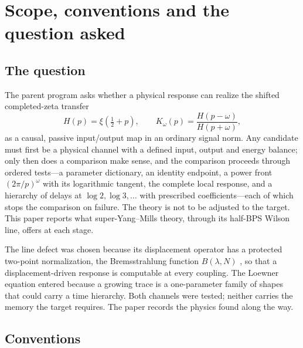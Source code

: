 \section{Scope, conventions and the question asked}
\label{sec:scope}

\subsection{The question}

The parent program asks whether a physical response can realize the shifted completed-zeta transfer
\begin{equation}
H(p)=\xi(\tfrac12+p),\qquad K_\omega(p)=\frac{H(p-\omega)}{H(p+\omega)},
\label{eq:target}
\end{equation}
as a causal, passive input/output map in an ordinary signal norm. Any candidate must first be a physical
channel with a defined input, output and energy balance; only then does a comparison make sense, and the
comparison proceeds through ordered tests---a parameter dictionary, an identity endpoint, a power front
$(2\pi/p)^\omega$ with its logarithmic tangent, the complete local response, and a hierarchy of delays at
$\log 2,\log 3,\dots$ with prescribed coefficients---each of which stops the comparison on failure. The
theory is not to be adjusted to the target. This paper reports what \Nfour{} super-Yang--Mills theory,
through its half-BPS Wilson line, offers at each stage.

The line defect was chosen because its displacement operator has a protected two-point normalization,
the Bremsstrahlung function $B(\lambda,N)$ \cite{CHMS}, so that a displacement-driven response is
computable at every coupling. The Loewner equation entered because a growing trace is a one-parameter
family of shapes that could carry a time hierarchy. Both channels were tested; neither carries the
memory the target requires. The paper records the physics found along the way.

\subsection{Conventions}

